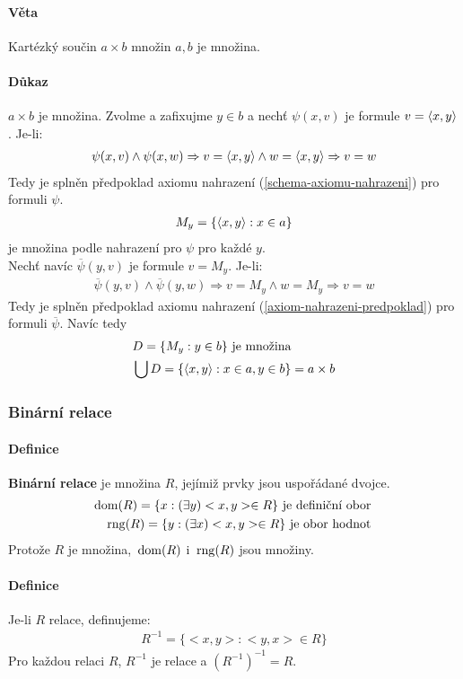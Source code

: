 \documentclass[a4paper,12pt,titlepage]{article}
\begin{document}
\paragraph{Věta}
Kartézký součin $a \times b$ množin $a,b$ je množina.
\paragraph{Důkaz}
$a \times b$ je množina. Zvolme a zafixujme $y \in b$ a
nechť $\psi(x,v)$ je formule $v = \langle x,y \rangle$. Je-li:
\begin{align}
	\psi(x,v) \land \psi(x,w) \Rightarrow v = \langle x,y \rangle \land w = \langle x,y \rangle 
	\Rightarrow
	v = w
\end{align}
Tedy je splněn předpoklad axiomu nahrazení (\ref{schema-axiomu-nahrazeni})
pro formuli $\psi$.
\begin{align}
	M_y = \{ \langle x,y\rangle  : x \in a\}
\end{align}
je množina podle nahrazení pro $\psi$ pro každé $y$. \\
Nechť navíc $\overline{\psi}(y,v)$ je formule $v = M_y$. Je-li:
\begin{align}
	\overline{\psi}(y,v) \land \overline{\psi}(y,w) \Rightarrow v = M_y \land w = M_y
	\Rightarrow v = w
\end{align}
Tedy je splněn předpoklad axiomu nahrazení (\ref{axiom-nahrazeni-predpoklad})
pro formuli $\overline{\psi}$. Navíc tedy
\begin{align}
	&D = \{ M_y : y \in b \} \text{ je množina } \\
	&\bigcup D = \{\langle x,y\rangle : x \in a, y \in b \} = a \times b
\end{align}


\subsubsection{Binární relace}
\setcounter{equation}{0}
\paragraph{Definice}
\textbf{Binární relace} je množina $R$, jejímiž prvky jsou uspořádané dvojce.
\begin{align}
	\operatorname*{\,dom}(R) = \{ x : (\exists y) <x,y> \in R \} \text{ je definiční obor } \\
	\operatorname*{\,rng}(R) = \{ y : (\exists x) <x,y> \in R \} \text{ je obor hodnot }
\end{align}
Protože $R$ je množina, $\operatorname*{\,dom}(R)$ i $\operatorname*{\,rng}(R)$ jsou množiny.
\paragraph{Definice}
Je-li $R$ relace, definujeme:
\begin{align}
	R^{-1} = \{ <x,y>: <y,x> \in R \}
\end{align}
Pro každou relaci $R$, $R^{-1}$ je relace a $(R^{-1})^{-1} = R$.
\end{document}
